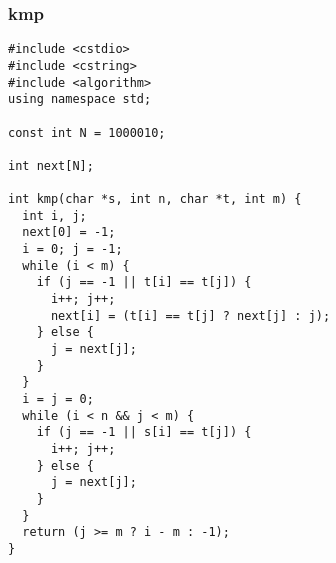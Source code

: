 \subsubsection{kmp}
\begin{verbatim}
#include <cstdio>
#include <cstring>
#include <algorithm>
using namespace std;

const int N = 1000010;

int next[N];

int kmp(char *s, int n, char *t, int m) {
  int i, j;
  next[0] = -1;
  i = 0; j = -1;
  while (i < m) {
    if (j == -1 || t[i] == t[j]) {
      i++; j++;
      next[i] = (t[i] == t[j] ? next[j] : j);
    } else {
      j = next[j];
    }
  }
  i = j = 0;
  while (i < n && j < m) {
    if (j == -1 || s[i] == t[j]) {
      i++; j++;
    } else {
      j = next[j];
    }
  }
  return (j >= m ? i - m : -1);
}
\end{verbatim}
